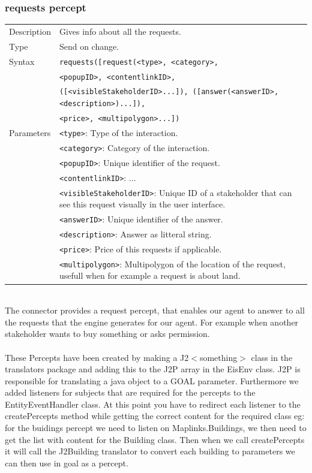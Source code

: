 	\subsubsection*{requests percept}
		\begin{small}
			\begin{tabular}{p{2cm}p{9cm}}
				Description 	& Gives info about all the requests.\\
				Type 		& Send on change.\\
				Syntax 	& \verb|requests([request(<type>, <category>, |\\
					 	& \verb|<popupID>, <contentlinkID>, |\\
					 	& \verb|([<visibleStakeholderID>...]), ([answer(<answerID>, <description>)...]), |\\
					 	& \verb|<price>, <multipolygon>...]) |\\
				Parameters 	& \verb|<type>|: Type of the interaction.\\
						& \verb|<category>|: Category of the interaction.\\
						& \verb|<popupID>|:  Unique identifier of the request.\\
						& \verb|<contentlinkID>|: ...\\
						& \verb|<visibleStakeholderID>|: Unique ID of a stakeholder that can see this request visually in the user interface.\\
						& \verb|<answerID>|: Unique identifier of the answer.\\
						& \verb|<description>|: Answer as litteral string.\\
						& \verb|<price>|: Price of this requests if applicable.\\
						& \verb|<multipolygon>|: Multipolygon of the location of the request, usefull when for example a request is about land.\\
			\end{tabular}
		\end{small}
	\\The connector provides a request percept, that enables our agent to answer to all the requests that the engine generates for our agent. For example when another stakeholder wants to buy something or asks permission.
\\
\\
These Percepts have been created by making a J2$<$something$>$ class in the translators package and adding this to the J2P array in the EisEnv class. J2P is responsible for translating a java object to a GOAL parameter. Furthermore we added listeners for subjects that are required for the percepts to the EntityEventHandler class. At this point you have to redirect each listener to the createPercepts method while getting the correct content for the required class eg: for the buidings percept we need to listen on Maplinks.Buildings, we then need to get the list with content for the Building class. Then when we call createPercepts it will call the J2Building translator to convert each building to parameters we can then use in goal as a percept.

